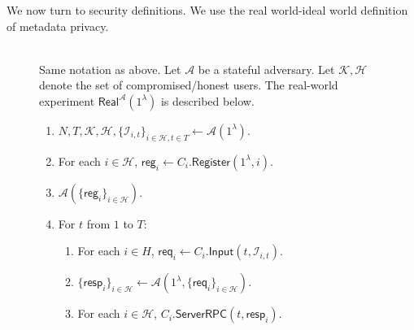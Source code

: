 \documentclass[sigconf, nonacm, balance=false, natbib=false, screen]{acmart}
\newcommand{\reg}{\mathsf{reg}}
\newcommand{\req}{\mathsf{req}}
\newcommand{\resp}{\mathsf{resp}}
\newcommand{\cK}{\mathcal{K}}
\newcommand{\cA}{\mathcal{A}}
\newcommand{\cI}{\mathcal{I}}
\newcommand{\cH}{\mathcal{H}}
\begin{document}
We now turn to security definitions. We use the real world-ideal world definition of metadata privacy.
\begin{figure}[h!]
\begin{framed}
\begin{definition} \hfill\\
Same notation as above. Let $\cA$ be a stateful adversary. Let $\cK, \cH$ denote the set of compromised/honest users. The real-world experiment $\mathsf{Real}^{\cA}(1^{\lambda})$ is described below.
\begin{enumerate}
\item $N, T, \cK, \cH, \{\cI_{i, t}\}_{i \in \cH, t \in T} \leftarrow \cA(1^{\lambda})$.
\item For each $i \in \cH$, $\reg_i \leftarrow C_i.\mathsf{Register}(1^{\lambda}, i)$. 
\item $\cA(\{\reg_i\}_{i \in \cH})$.
\item For $t$ from $1$ to $T$:
    \begin{enumerate}
    \item For each $i \in H$, $\req_i \leftarrow C_i.\mathsf{Input}(t, \cI_{i, t})$.
    
    \item $\{\resp_i\}_{i \in \cH} \leftarrow \cA(1^{\lambda}, \{\req_i\}_{i \in \cH})$.
    
    \item For each $i \in \cH$, $C_i.\mathsf{ServerRPC}(t, \resp_i)$.
    \end{enumerate}
\end{enumerate}
\end{definition}
\end{framed}
\end{figure}
\end{document}
